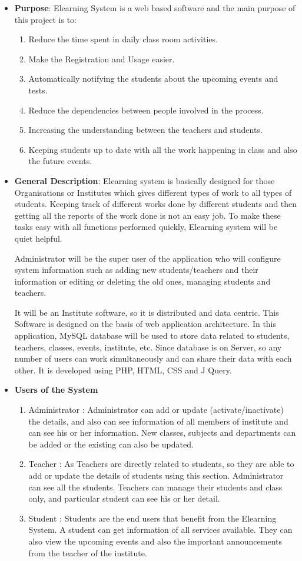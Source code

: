 \begin{itemize}
\item{\bf Purpose}: Elearning System is a web based software and the 
main purpose of this project is to:
\begin{enumerate}
\item Reduce the time spent in daily class room activities.
\item Make the Registration and Usage easier.
\item Automatically notifying the students about the upcoming events and tests.
\item Reduce the dependencies between people involved in the process.
\item Increasing the understanding between the teachers and students.
\item Keeping students up to date with all the work happening in class and also the future    events.
\end{enumerate}
\item{\bf General Description}: Elearning system is basically 
designed for those Organisations or Institutes which gives different 
types of work to all types of students. Keeping track of different 
works done by different students and then getting all the reports of 
the work done is not an easy job. To make these tasks easy with all 
functions performed quickly, Elearning system will be quiet helpful.

Administrator will be the super user of the application who will 
configure system information such as adding new students/teachers and their 
information or editing or deleting the old ones, managing students and teachers.

It will be an Institute software, so it is distributed and data centric. 
This Software is designed on the basis of web application architecture. 
In this application, MySQL database will be used to store data related 
to students, teachers, classes, events, institute, etc. Since 
database is on Server, so any number of users can work simultaneously 
and can share their data with each other. It is developed using PHP, HTML, CSS and J Query.
\item{\bf Users of the System}
\begin{enumerate} 
\item Administrator : Administrator can add or update 
(activate/inactivate) the details, and also can see information of all 
members of institute and can see his or her information. New classes, subjects and departments can be added or the existing can also be updated.
\item Teacher : As Teachers are directly related to students, so they 
are able to add or update the details of students using this section. 
Administrator can see all the students. Teachers can manage their 
students and class only, and particular student can see his or her detail.
\item Student : Students are the end users that benefit from the 
Elearning System. A student can get information of all services 
available. They can also view the upcoming events and also the important announcements
from the teacher of the institute.
\end{enumerate}
\end{itemize}
